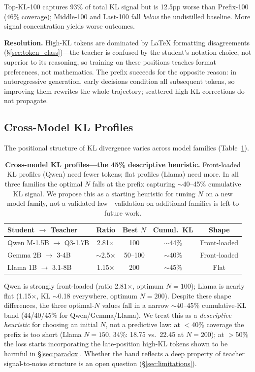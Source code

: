 \documentclass[10pt]{article}
\begin{document}
Top-KL-100 captures 93\% of total KL signal but is 12.5pp worse than Prefix-100 (46\% coverage); Middle-100 and Last-100 fall \emph{below} the undistilled baseline. More signal concentration yields worse outcomes.

\textbf{Resolution.} High-KL tokens are dominated by LaTeX formatting disagreements (\S\ref{sec:token_class})---the teacher is confused by the student's notation choice, not superior to its reasoning, so training on these positions teaches format preferences, not mathematics. The prefix succeeds for the opposite reason: in autoregressive generation, early decisions condition all subsequent tokens, so improving them rewrites the whole trajectory; scattered high-KL corrections do not propagate.

\subsection{Cross-Model KL Profiles}
\label{sec:cross_kl}

The positional structure of KL divergence varies across model families (Table~\ref{tab:kl_profiles}).

\begin{table}[t]
\centering
\caption{\textbf{Cross-model KL profiles---the 45\% descriptive heuristic.} Front-loaded KL profiles (Qwen) need fewer tokens; flat profiles (Llama) need more. In all three families the optimal $N$ falls at the prefix capturing $\sim$40--45\% cumulative KL signal. We propose this as a starting heuristic for tuning $N$ on a new model family, not a validated law---validation on additional families is left to future work.}
\label{tab:kl_profiles}
\small
\begin{tabular}{@{}lcccc@{}}
\toprule
\textbf{Student $\to$ Teacher} & \textbf{Ratio} & \textbf{Best $N$} & \textbf{Cumul.\ KL} & \textbf{Shape} \\
\midrule
Qwen M-1.5B $\to$ Q3-1.7B & 2.81$\times$ & 100 & $\sim$44\% & Front-loaded \\
Gemma 2B $\to$ 3-4B        & $\sim$2.5$\times$ & 50--100 & $\sim$40\% & Front-loaded \\
Llama 1B $\to$ 3.1-8B      & 1.15$\times$ & 200 & $\sim$45\% & Flat \\
\bottomrule
\end{tabular}
\end{table}

Qwen is strongly front-loaded (ratio 2.81$\times$, optimum $N=100$); Llama is nearly flat (1.15$\times$, KL $\sim$0.18 everywhere, optimum $N=200$).
Despite these shape differences, the three optimal-$N$ values fall in a narrow $\sim$40--45\% cumulative-KL band (44/40/45\% for Qwen/Gemma/Llama).
We treat this as a \emph{descriptive heuristic} for choosing an initial $N$, not a predictive law: at $<$40\% coverage the prefix is too short (Llama $N{=}150$, 34\%: 18.75 vs.\ 22.45 at $N{=}200$); at $>$50\% the loss starts incorporating the late-position high-KL tokens shown to be harmful in \S\ref{sec:paradox}.
Whether the band reflects a deep property of teacher signal-to-noise structure is an open question (\S\ref{sec:limitations}).
\end{document}
